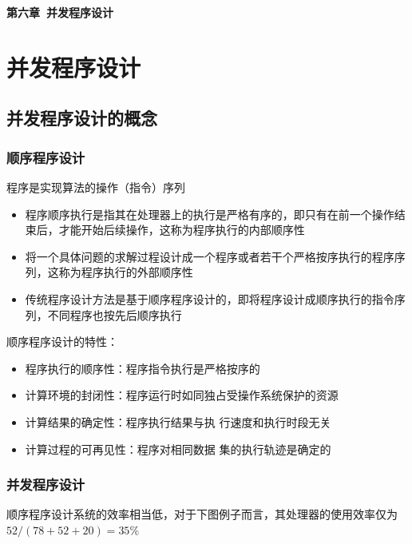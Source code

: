 \documentclass[cs4size,a4paper,10pt]{ctexart}
\begin{document}
	\begin{center}
		{\huge\textbf{第六章\ 并发程序设计}}
	\end{center}
	\tableofcontents
	\clearpage

	\setcounter{page}{1}
	\setlength{\parskip}{0.65em}
	
	\section{并发程序设计}
	\subsection{并发程序设计的概念}

	\subsubsection{顺序程序设计}

	程序是实现算法的操作（指令）序列
	\begin{itemize}
		\item 程序顺序执行是指其在处理器上的执行是严格有序的，即只有在前一个操作结束后，才能开始后续操作，这称为程序执行的内部顺序性
		\item 将一个具体问题的求解过程设计成一个程序或者若干个严格按序执行的程序序列，这称为程序执行的外部顺序性
		\item 传统程序设计方法是基于顺序程序设计的，即将程序设计成顺序执行的指令序列，不同程序也按先后顺序执行
	\end{itemize}

	顺序程序设计的特性：
	\begin{itemize}
		\item 程序执行的顺序性：程序指令执行是严格按序的
		\item 计算环境的封闭性：程序运行时如同独占受操作系统保护的资源
		\item 计算结果的确定性：程序执行结果与执 行速度和执行时段无关
		\item 计算过程的可再见性：程序对相同数据 集的执行轨迹是确定的
	\end{itemize}

	\subsubsection{并发程序设计}

	顺序程序设计系统的效率相当低，对于下图例子而言，其处理器的使用效率仅为$52/(78+52+20)=35\%$
\end{document}
